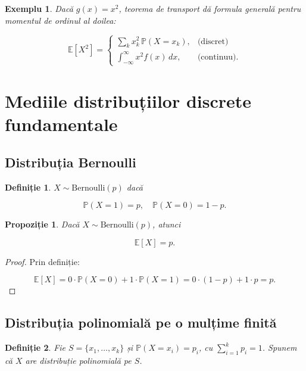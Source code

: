 \documentclass[12pt]{article}
\theoremstyle{plain}
\newtheorem{definition}{Definiție}
\newtheorem{proposition}{Propoziție}
\newtheorem{example}{Exemplu}
\begin{document}
\begin{example}
Dacă $g(x)=x^2$, teorema de transport dă formula generală pentru momentul de ordinul al doilea:



\[
\mathbb{E}[X^2] =
\begin{cases}
\sum_k x_k^2\,\mathbb{P}(X=x_k), & \text{(discret)} \\[6pt]
\int_{-\infty}^{\infty} x^2 f(x)\,dx, & \text{(continuu)}.
\end{cases}
\]



\end{example}

\bigskip


\section{Mediile distribuțiilor discrete fundamentale}

\subsection{Distribuția Bernoulli}

\begin{definition}
$X \sim \mathrm{Bernoulli}(p)$ dacă


\[
\mathbb{P}(X=1)=p,\quad \mathbb{P}(X=0)=1-p.
\]


\end{definition}

\begin{proposition}
Dacă $X \sim \mathrm{Bernoulli}(p)$, atunci


\[
\mathbb{E}[X] = p.
\]


\end{proposition}

\begin{proof}
Prin definiție:


\[
\mathbb{E}[X] = 0\cdot \mathbb{P}(X=0) + 1\cdot \mathbb{P}(X=1)
= 0\cdot (1-p) + 1\cdot p = p.
\]


\end{proof}

\subsection{Distribuția polinomială pe o mulțime finită}

\begin{definition}
Fie $S = \{x_1,\dots,x_k\}$ și $\mathbb{P}(X=x_i)=p_i$, cu $\sum_{i=1}^k p_i=1$.
Spunem că $X$ are distribuție polinomială pe $S$.
\end{definition}
\end{document}
